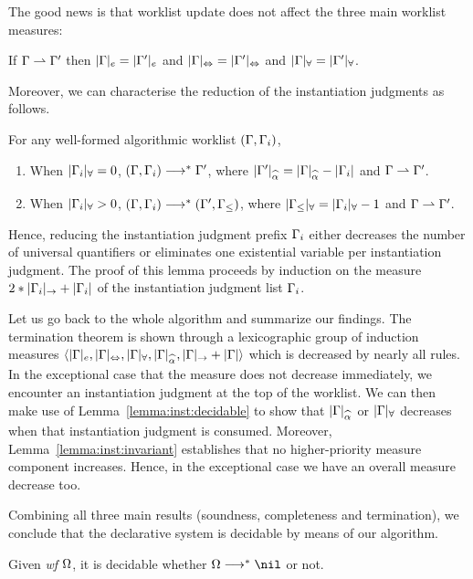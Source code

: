 The good news is that worklist update does not affect the three main worklist measures:
\newcommand{\equivGm}[1]{|\Gm|_{#1} = |\Gm'|_{#1}}\label{lemma:inst:invariant}
\begin{lemma}
If $\Gamma\rightharpoonup\Gamma'$ then $\equivGm{e}$ and $\equivGm\Leftrightarrow$ and $\equivGm\forall$.
\end{lemma}

Moreover, we can characterise the reduction of the instantiation judgments as follows.
\begin{lemma}\label{lemma:inst:decidable}
For any well-formed algorithmic worklist $(\Gamma, \Gamma_i)$,
\begin{enumerate}[1)]
    \item When $|\Gamma_i|_\forall = 0$, $(\Gamma, \Gamma_i) \longrightarrow^* \Gamma'$,
        where $|\Gm'|_{\al} = |\Gm|_{\al} - |\Gm_i|$ and $\Gamma\rightharpoonup\Gamma'$.
    \item When $|\Gamma_i|_\forall > 0$, $(\Gamma, \Gamma_i) \longrightarrow^* (\Gamma', \Gamma_\le)$,
        where $|\Gamma_\le|_\forall = |\Gamma_i|_\forall - 1$ and $\Gamma\rightharpoonup\Gamma'$.
\end{enumerate}
\end{lemma}
Hence, reducing the instantiation judgment prefix $\Gamma_i$ either
decreases the number of universal quantifiers or 
eliminates one existential variable per instantiation judgment.
The proof of this lemma proceeds by induction on the measure $2*|\Gamma_i|_\to + |\Gamma_i|$
of the instantiation judgment list $\Gamma_i$.

Let us go back to the whole algorithm and summarize our findings.
The termination theorem is shown through a lexicographic group of induction measures
$\langle |\Gm|_e, |\Gm|_\Leftrightarrow, |\Gm|_\forall, |\Gm|_{\al}, |\Gm|_\to + |\Gm| \rangle$
which is decreased by nearly all rules.
In the exceptional case that the measure does not decrease immediately, 
we encounter an instantiation judgment at the top of the worklist. We can then
make use of Lemma~\ref{lemma:inst:decidable} to show that $|\Gm|_{\al}$ or $|\Gamma|_\forall$ decreases
when that instantiation judgment is consumed. Moreover, Lemma~\ref{lemma:inst:invariant} establishes
that no higher-priority measure component increases. Hence, in the exceptional case we have an overall measure decrease too.

Combining all three main results (soundness, completeness and termination), we conclude that the declarative system is decidable
by means of our algorithm.
\begin{corollary}
Given \emph{wf }$\Omega$, it is decidable whether $\Om\redto\nil$ or not.
\end{corollary}

